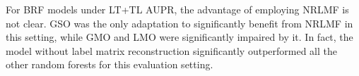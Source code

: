 

%

For BRF models under LT+TL AUPR, the advantage of employing NRLMF is not clear. GSO was the only adaptation to significantly benefit from NRLMF in this setting, while GMO and LMO were significantly impaired by it. In fact, the  model without label matrix reconstruction significantly outperformed all the other random forests for this evaluation setting.




